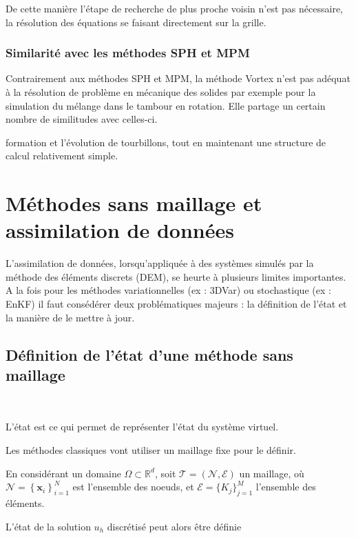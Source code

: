 De cette manière l'étape de recherche de plus proche voisin n'est pas nécessaire, la résolution des équations se faisant directement sur la grille.

\subsubsection{Similarité avec les méthodes SPH et MPM}

Contrairement aux méthodes SPH et MPM, la méthode Vortex n'est pas adéquat à la résolution de problème en mécanique des solides par exemple pour la simulation du mélange dans le tambour en rotation. Elle partage un certain nombre de similitudes avec celles-ci.


formation et l'évolution de tourbillons, tout en maintenant une structure de calcul relativement simple.

\section{Méthodes sans maillage et assimilation de données}

L'assimilation de données, lorsqu'appliquée à des systèmes simulés par la méthode des éléments discrets (DEM), se heurte à plusieurs limites importantes. A la fois pour les méthodes variationnelles (ex : 3DVar) ou stochastique (ex : EnKF) il faut consédérer deux problématiques majeurs : la définition de l'état et la manière de le mettre à jour.

\subsection{Définition de l'état d'une méthode sans maillage}~\label{sec:etat_meshless}

L'état est ce qui permet de représenter l'état du système virtuel.

Les méthodes classiques vont utiliser un maillage fixe pour le définir.

En considérant un domaine $\Omega \subset \mathbb R^d$, soit $\mathcal{T} = (\mathcal N, \mathcal E)$ un maillage, où $\mathcal N = \left\{\bm x_i \right\}^N_{i=1}$ est l'ensemble des noeuds, et $\mathcal{E} = \{ K_j \}_{j=1}^{M}$ l'ensemble des éléments.

L'état de la solution \(u_h\) discrétisé peut alors être définie

